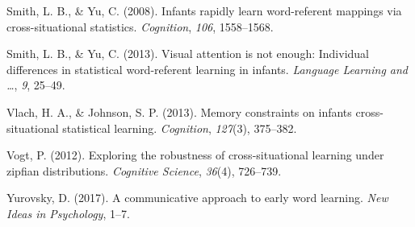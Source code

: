 \documentclass[10pt, letterpaper]{article}
\begin{document}
\hypertarget{ref-smith2008}{}
Smith, L. B., \& Yu, C. (2008). Infants rapidly learn word-referent
mappings via cross-situational statistics. \emph{Cognition}, \emph{106},
1558--1568.

\hypertarget{ref-smith2013}{}
Smith, L. B., \& Yu, C. (2013). Visual attention is not enough:
Individual differences in statistical word-referent learning in infants.
\emph{Language Learning and \ldots{}}, \emph{9}, 25--49.

\hypertarget{ref-vlach2013}{}
Vlach, H. A., \& Johnson, S. P. (2013). Memory constraints on infants
cross-situational statistical learning. \emph{Cognition}, \emph{127}(3),
375--382.

\hypertarget{ref-vogt2012}{}
Vogt, P. (2012). Exploring the robustness of cross-situational learning
under zipfian distributions. \emph{Cognitive Science}, \emph{36}(4),
726--739.

\hypertarget{ref-yurovsky2017}{}
Yurovsky, D. (2017). A communicative approach to early word learning.
\emph{New Ideas in Psychology}, 1--7.
\end{document}
